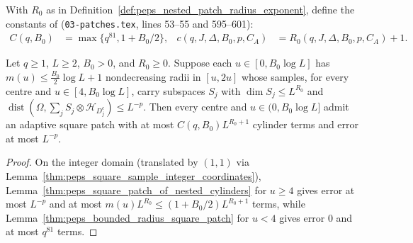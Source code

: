 \begin{definition}
    \label{def:peps_adaptive_patch_constants}
    \leanok
    With $R_0$ as in Definition~\ref{def:peps_nested_patch_radius_exponent},
    define the constants of \cite[Proposition~4.1]{OpenAI2026PolynomialPEPS}
    (\texttt{03-patches.tex}, lines 53--55 and 595--601):
    \begin{align}
        C(q,B_0)                & =\max\{q^{81},1+B_0/2\},      &
        c(q,J,\Delta,B_0,p,C_A) & =R_0(q,J,\Delta,B_0,p,C_A)+1.
        \label{eq:peps_adaptive_patch_constants}
    \end{align}
\end{definition}

\begin{lemma}
    \label{lem:peps_adaptive_patch_supply_core}
    \leanok
    Let $q\ge1$, $L\ge2$, $B_0>0$, and $R_0\ge0$. Suppose each $u\in[0,B_0\log L]$
    has $m(u)\le\frac{B_0}{2}\log L+1$ nondecreasing radii in $[u,2u]$ whose
    samples, for every centre and $u\in[4,B_0\log L]$, carry subspaces
    $S_j$ with $\dim S_j\le L^{R_0}$ and
    $\operatorname{dist}(\Omega,\sum_j S_j\otimes\mathcal H_{D_j^c})\le L^{-p}$.
    Then every centre and $u\in(0,B_0\log L]$ admit an adaptive square patch
    with at most $C(q,B_0)L^{R_0+1}$ cylinder terms and error at most $L^{-p}$.
\end{lemma}
\begin{proof}
    \leanok
    On the integer domain (translated by $(1,1)$ via
    Lemma~\ref{thm:peps_square_sample_integer_coordinates}),
    Lemma~\ref{thm:peps_square_patch_of_nested_cylinders} for $u\ge4$ gives
    error at most $L^{-p}$ and at most $m(u)L^{R_0}\le(1+B_0/2)L^{R_0+1}$ terms,
    while Lemma~\ref{thm:peps_bounded_radius_square_patch} for $u<4$ gives
    error $0$ and at most $q^{81}$ terms.
\end{proof}

